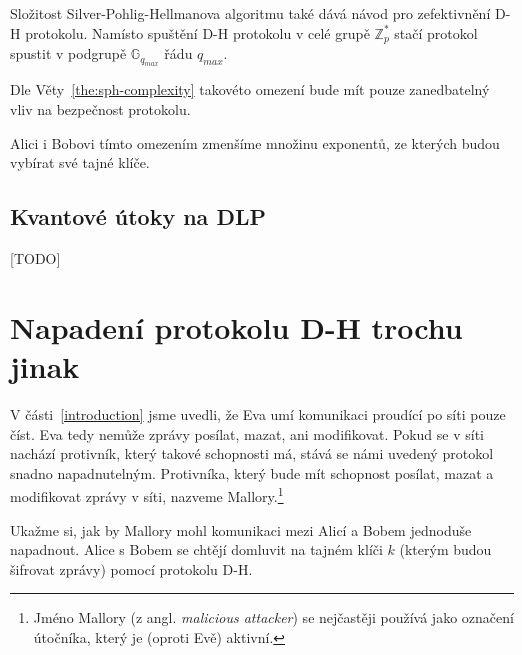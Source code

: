 \documentclass[
  program=infoi,
  biblatex,
  figures=false,
  glossaries,
  index
]{kidiplom}
\begin{document}
            \begin{remark}\label{rem:diffie-hellman-improved}
                
                Složitost Silver-Pohlig-Hellmanova algoritmu také dává návod pro zefektivnění D-H protokolu.
                Namísto spuštění D-H protokolu v celé grupě $\mathbb{Z}^*_p$ stačí protokol spustit
                v podgrupě $\mathbb{G}_{q_{max}}$ řádu $q_{max}$.
            
                Dle Věty~\ref{the:sph-complexity} takovéto omezení bude mít pouze zanedbatelný vliv na bezpečnost protokolu.

                Alici i Bobovi tímto omezením zmenšíme množinu exponentů, ze kterých budou vybírat své tajné klíče.

            \end{remark}


    \subsection{Kvantové útoky na DLP}

        [TODO]
    


\section{Napadení protokolu D-H trochu jinak}

    V části~\ref{introduction} jsme uvedli, že Eva umí komunikaci proudící po síti pouze číst. Eva tedy nemůže zprávy posílat, mazat, ani modifikovat.
    Pokud se v síti nachází protivník, který takové schopnosti má, stává se námi uvedený protokol snadno napadnutelným. Protivníka, který bude mít
    schopnost posílat, mazat a modifikovat zprávy v síti, nazveme Mallory.\footnote{Jméno Mallory (z angl. \emph{malicious attacker}) se nejčastěji používá jako
    označení útočníka, který je (oproti Evě) aktivní.}

    \bigskip

    Ukažme si, jak by Mallory mohl komunikaci mezi Alicí a Bobem jednoduše napadnout.
    Alice s Bobem se chtějí domluvit na tajném klíči $k$ (kterým budou šifrovat zprávy) pomocí protokolu D-H.
\end{document}
